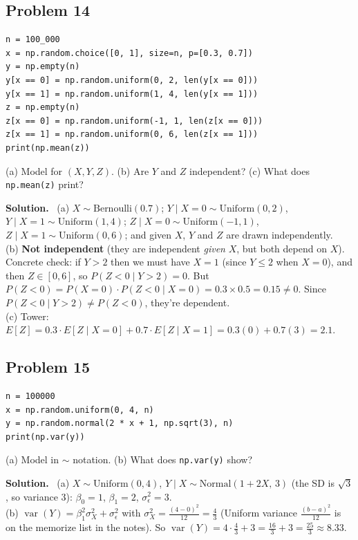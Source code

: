 \documentclass[11pt]{article}
\newcommand{\Bern}{\text{Bernoulli}}
\newcommand{\Unif}{\text{Uniform}}
\newcommand{\Norm}{\text{Normal}}
\newcommand{\py}[1]{\texttt{#1}}
\newenvironment{soln}{\par\smallskip\noindent\textbf{Solution.}\ }{\par\medskip}
\begin{document}
\subsection*{Problem 14}
\begin{lstlisting}
n = 100_000
x = np.random.choice([0, 1], size=n, p=[0.3, 0.7])
y = np.empty(n)
y[x == 0] = np.random.uniform(0, 2, len(y[x == 0]))
y[x == 1] = np.random.uniform(1, 4, len(y[x == 1]))
z = np.empty(n)
z[x == 0] = np.random.uniform(-1, 1, len(z[x == 0]))
z[x == 1] = np.random.uniform(0, 6, len(z[x == 1]))
print(np.mean(z))
\end{lstlisting}
(a) Model for $(X,Y,Z)$. (b) Are $Y$ and $Z$ independent? (c) What does \py{np.mean(z)} print?
\begin{soln}
(a) $X\sim\Bern(0.7)$; $Y\mid X{=}0\sim\Unif(0,2)$, $Y\mid X{=}1\sim\Unif(1,4)$; $Z\mid X{=}0\sim\Unif(-1,1)$, $Z\mid X{=}1\sim\Unif(0,6)$; and given $X$, $Y$ and $Z$ are drawn independently.\\
(b) \textbf{Not independent} (they are independent \emph{given} $X$, but both depend on $X$). Concrete check: if $Y>2$ then we must have $X=1$ (since $Y\le2$ when $X=0$), and then $Z\in[0,6]$, so $P(Z<0\mid Y>2)=0$. But $P(Z<0)=P(X{=}0)\cdot P(Z<0\mid X{=}0)=0.3\times0.5=0.15\ne0$. Since $P(Z<0\mid Y>2)\ne P(Z<0)$, they're dependent.\\
(c) Tower: $E[Z]=0.3\cdot E[Z\mid X{=}0]+0.7\cdot E[Z\mid X{=}1]=0.3(0)+0.7(3)=2.1$.
\end{soln}

\subsection*{Problem 15}
\begin{lstlisting}
n = 100000
x = np.random.uniform(0, 4, n)
y = np.random.normal(2 * x + 1, np.sqrt(3), n)
print(np.var(y))
\end{lstlisting}
(a) Model in $\sim$ notation. (b) What does \py{np.var(y)} show?
\begin{soln}
(a) $X\sim\Unif(0,4)$, $Y\mid X\sim\Norm(1+2X,\,3)$ (the SD is $\sqrt3$, so variance $3$): $\beta_0=1$, $\beta_1=2$, $\sigma_\epsilon^2=3$.\\
(b) $\operatorname{var}(Y)=\beta_1^2\sigma_X^2+\sigma_\epsilon^2$ with $\sigma_X^2=\frac{(4-0)^2}{12}=\frac43$ (Uniform variance $\frac{(b-a)^2}{12}$ is on the memorize list in the notes). So $\operatorname{var}(Y)=4\cdot\frac43+3=\frac{16}3+3=\frac{25}3\approx8.33$.
\end{soln}
\end{document}
